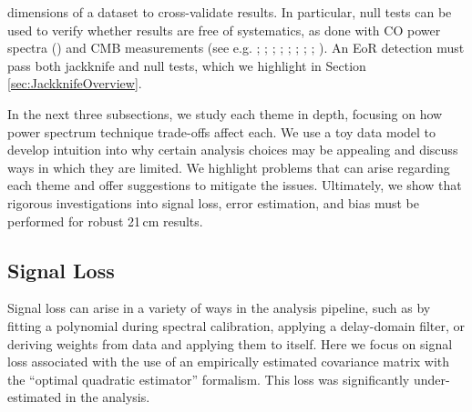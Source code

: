 \documentclass[preprint2,numberedappendix,tighten]{aastex6}  %
\begin{document}
\begin{itemize}
dimensions of a dataset to cross-validate results. In particular, null tests can be used to verify whether results are free of 
systematics, as done with CO power spectra (\citealt{keating_et_al2016}) and CMB measurements (see e.g. \citealt{ade_et_al2008}; \citealt{chiang_et_al2010}; \citealt{bischoff_et_al2011}; \citealt{das_et_al2011b}; \citealt{araujo_et_al2012}; \citealt{crites_et_al2015}; \citealt{ade_et_al2016}; \citealt{ade_et_al2017}; \citealt{sherwin_et_al2017}). An EoR detection must pass both jackknife and null tests, which we highlight in Section \ref{sec:JackknifeOverview}.
\end{itemize}

In the next three subsections, we study each theme in depth, focusing on how power spectrum technique trade-offs affect each. 
We use a toy data model to develop intuition into why certain analysis choices may be appealing and discuss ways in which 
they are limited. We highlight problems that can arise regarding each theme and offer suggestions to mitigate the issues. 
Ultimately, we show that rigorous investigations into signal loss, error estimation, and bias must be performed for robust 21\,cm results.


\subsection{Signal Loss}
\label{sec:SiglossOverview}

Signal loss can arise in a variety of ways in the analysis pipeline, such as by fitting a polynomial during spectral calibration, applying a delay-domain filter, or deriving weights from data and applying them to itself. Here we focus on signal loss associated with 
the use of an empirically estimated covariance matrix with the ``optimal quadratic estimator'' formalism.
This loss was significantly 
under-estimated in the  analysis.

\end{document}
